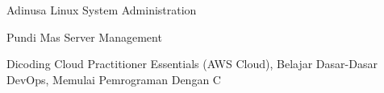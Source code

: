 

\begin{cvskills}

  \cvskill
    {Adinusa} %
    {Linux System Administration} %

  \cvskill
    {Pundi Mas} %
    {Server Management} %

  \cvskill
    {Dicoding} %
    {Cloud Practitioner Essentials (AWS Cloud), Belajar Dasar-Dasar DevOps,
    Memulai Pemrograman Dengan C} %

\end{cvskills}
